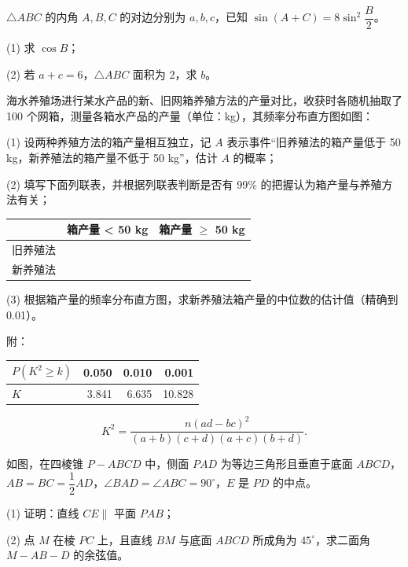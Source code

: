 \begin{question}
\(\triangle ABC\) 的内角 \(A,B,C\) 的对边分别为 \(a,b,c\)，已知 \(\sin(A+C)=8\sin^2\dfrac{B}{2}\)。

   (1) 求 \(\cos B\)；

   (2) 若 \(a+c=6\)，\(\triangle ABC\) 面积为 2，求 \(b\)。

\Needspace{0.4\textheight}
\end{question}
\begin{question}
海水养殖场进行某水产品的新、旧网箱养殖方法的产量对比，收获时各随机抽取了 100 个网箱，测量各箱水产品的产量（单位：kg），其频率分布直方图如图：
\nopagebreak[4]
\begin{center}\end{center}
\nopagebreak[4]
   (1) 设两种养殖方法的箱产量相互独立，记 \(A\) 表示事件“旧养殖法的箱产量低于 50 kg，新养殖法的箱产量不低于 50 kg”，估计 \(A\) 的概率；

   (2) 填写下面列联表，并根据列联表判断是否有 99\% 的把握认为箱产量与养殖方法有关；

\begin{center}
\begin{tabular}{lrr}
\toprule
 & 箱产量 < 50 kg & 箱产量 $\geq$ 50 kg \\
\midrule
旧养殖法 &  &  \\
新养殖法 &  &  \\
\bottomrule
\end{tabular}
\end{center}

   (3) 根据箱产量的频率分布直方图，求新养殖法箱产量的中位数的估计值（精确到 0.01）。

   附：

\begin{center}
\begin{tabular}{lrrr}
\toprule
\(P(K^2\geq k)\) & 0.050 & 0.010 & 0.001 \\
\midrule
\(K\) & 3.841 & 6.635 & 10.828 \\
\bottomrule
\end{tabular}
\end{center}

\nopagebreak[4]
\[
   K^2=\frac{n(ad-bc)^2}{(a+b)(c+d)(a+c)(b+d)}.
\]

\Needspace{0.4\textheight}
\end{question}
\begin{question}
如图，在四棱锥 \(P-ABCD\) 中，侧面 \(PAD\) 为等边三角形且垂直于底面 \(ABCD\)，\(AB=BC=\dfrac{1}{2}AD\)，\(\angle BAD=\angle ABC=90^\circ\)，\(E\) 是 \(PD\) 的中点。
\nopagebreak[4]
\begin{center}\end{center}
\nopagebreak[4]
   (1) 证明：直线 \(CE\parallel\) 平面 \(PAB\)；

   (2) 点 \(M\) 在棱 \(PC\) 上，且直线 \(BM\) 与底面 \(ABCD\) 所成角为 \(45^\circ\)，求二面角 \(M-AB-D\) 的余弦值。

\end{question}
